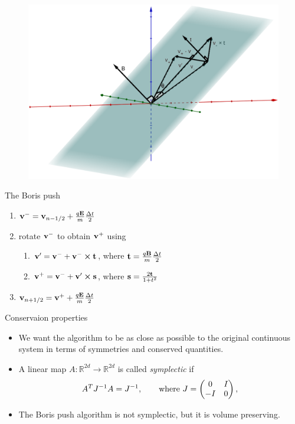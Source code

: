 \documentclass{beamer}
\begin{document}
\begin{frame}
	\begin{figure}
		\includegraphics[width=\textwidth]{Boris-rotation-3D}
	\end{figure}
\end{frame}

\begin{frame}{The Boris push}
	\begin{enumerate}
	  \item \(\vb{v}^- = \vb{v}_{n-1/2} + \frac{q \vb{E}}{m} \frac{\Delta t}{2}\)
	  \item rotate \(\vb{v}^-\) to obtain \(\vb{v}^+\) using
	  \begin{enumerate}
	    \item \(\vb{v}' = \vb{v}^- + \vb{v}^- \cp \vb{t}\), where \(\vb{t} = \frac{q \vb{B}}{m} \frac{\Delta t}{2}\)
	    \item \(\vb{v}^+ = \vb{v}^- + \vb{v}' \cp \vb{s}\), where \(\vb{s} = \frac{2 \vb{t}}{1+t^2}\)
	  \end{enumerate}
	  \item \(\vb{v}_{n+1/2} = \vb{v}^+ + \frac{q \vb{E}}{m} \frac{\Delta t}{2}\)
	\end{enumerate}
\end{frame}

\begin{frame}{Conservaion properties}
	\begin{itemize}
		\item We want the algorithm to be as close as possible to
		the original continuous system in terms of symmetries and conserved
		quantities.
		\item A linear map \(A: \mathbb{R}^{2d} \to \mathbb{R}^{2d}\) is called
  		\emph{symplectic} if
		  \[
		  A^T J^{-1} A = J^{-1},\qquad \text{where} \ J = \mqty(0 & I \\ -I & 0)\,,
		  \]
		\item The Boris push algorithm is not symplectic, but it is volume preserving.
	\end{itemize}
\end{frame}
\end{document}
